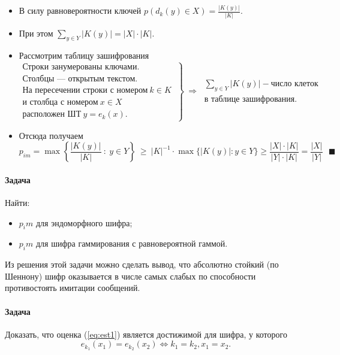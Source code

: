 \documentclass[a4paper,12pt]{article}
\newcommand{\refeq}[1]{(\ref{#1})}
\begin{document}
\begin{itemize}
	\item В силу равновероятности ключей $p(d_k(y)\in X) = \frac{|K(y)|}{|K|}$.
	\item При этом $\sum_{y\in Y} |K(y)| = |X|\cdot |K|$.
	\item Рассмотрим таблицу зашифрования
	$$
	\left.
	\begin{matrix}
		\text{Строки занумерованы ключами.} \\
		\text{Столбцы --- открытым текстом.} \\
		\text{На пересечении}\text{ строки с номером} ~ k \in K ~\\
		\text{и столбца с номером} ~ x \in X ~ \\
		\text{расположен ШТ} ~ y=e_k(x).
	\end{matrix}
	\right\} ~\Rightarrow ~ \begin{matrix} \sum_{y\in Y}|K(y)| - \text{число клеток}\\ \text{в таблице зашифрования}.\end{matrix}
	$$
	\item Отсюда получаем $$
	p_{im} = \max \left\{\frac{|K(y)|}{|K|} ~:~ y\in Y \right\} ~\ge~ |K|^{-1} \cdot \max\{|K(y)| : y \in Y \} \ge \frac{|X| \cdot |K|}{|Y| \cdot |K|} = \frac{|X|}{|Y|} ~~~\blacksquare
	$$
\end{itemize}

\paragraph{Задача}

Найти:
\begin{itemize}
	\item $p_im$ для эндоморфного шифра;
	\item $p_im$ для шифра гаммирования с равновероятной гаммой.
\end{itemize}

Из решения этой задачи можно сделать вывод, что абсолютно стойкий (по Шеннону) шифр оказывается в числе самых слабых по способности противостоять имитации
сообщений.

\paragraph{Задача}

Доказать, что оценка \refeq{eq:est1} является достижимой для шифра, у которого
$$
e_{k_1}(x_1) = e_{k_2}(x_2) \Leftrightarrow k_1 = k_2, x_1 = x_2.
$$
\end{document}
